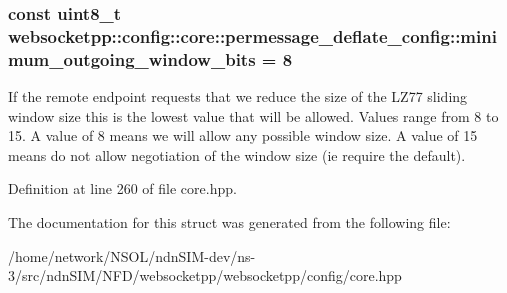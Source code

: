 \subsubsection[{\texorpdfstring{minimum\+\_\+outgoing\+\_\+window\+\_\+bits}{minimum\_outgoing\_window\_bits}}]{\setlength{\rightskip}{0pt plus 5cm}const uint8\+\_\+t websocketpp\+::config\+::core\+::permessage\+\_\+deflate\+\_\+config\+::minimum\+\_\+outgoing\+\_\+window\+\_\+bits = 8\hspace{0.3cm}{\ttfamily [static]}}\hypertarget{structwebsocketpp_1_1config_1_1core_1_1permessage__deflate__config_aa43d8526e2b89349b3fd9a5372507594}{}\label{structwebsocketpp_1_1config_1_1core_1_1permessage__deflate__config_aa43d8526e2b89349b3fd9a5372507594}
If the remote endpoint requests that we reduce the size of the L\+Z77 sliding window size this is the lowest value that will be allowed. Values range from 8 to 15. A value of 8 means we will allow any possible window size. A value of 15 means do not allow negotiation of the window size (ie require the default). 

Definition at line 260 of file core.\+hpp.



The documentation for this struct was generated from the following file\+:\begin{DoxyCompactItemize}
\item 
/home/network/\+N\+S\+O\+L/ndn\+S\+I\+M-\/dev/ns-\/3/src/ndn\+S\+I\+M/\+N\+F\+D/websocketpp/websocketpp/config/core.\+hpp\end{DoxyCompactItemize}
